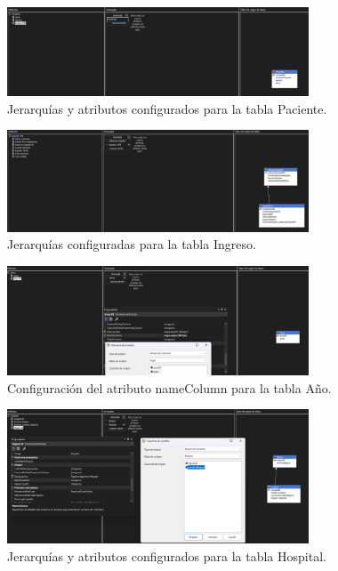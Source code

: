 \documentclass{article}
\begin{document}
\begin{figure}[H]
	\begin{center}
		\includegraphics[width=0.8\textwidth]{images/paciente_dim.png}
		\caption{Jerarquías y atributos configurados para la tabla Paciente.}
		\label{fig:paciente_dim}
	\end{center}
\end{figure}

\begin{figure}[H]
	\begin{center}
		\includegraphics[width=0.8\textwidth]{images/ingreso_dim.png}
		\caption{Jerarquías configuradas para la tabla Ingreso.}
		\label{fig:ingreso_dim}
	\end{center}
\end{figure}

\begin{figure}[H]
	\begin{center}
		\includegraphics[width=0.8\textwidth]{images/anyo_dim.png}
		\caption{Configuración del atributo nameColumn para la tabla Año.}
		\label{fig:anyo_dim}
	\end{center}
\end{figure}

\begin{figure}[H]
	\begin{center}
		\includegraphics[width=0.8\textwidth]{images/hospital_dim.png}
		\caption{Jerarquías y atributos configurados para la tabla Hospital.}
		\label{fig:hospital_dim}
	\end{center}
\end{figure}
\end{document}
